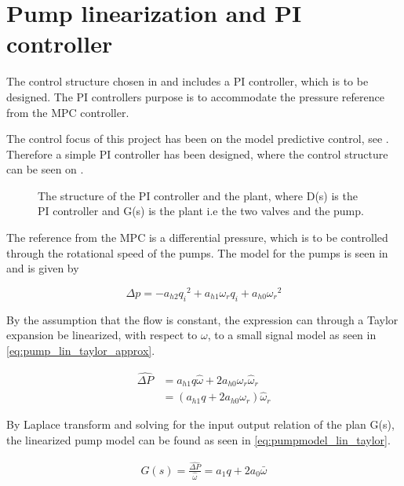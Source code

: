 \chapter{Pump linearization and PI controller}
\label{cha:linear_pump2}

The control structure chosen in  and  includes a PI controller, which is to be designed. The PI controllers purpose is to accommodate the pressure reference from the MPC controller. 

The control focus of this project has been on the model predictive control, see . Therefore a simple PI controller has been designed, where the control structure can be seen on .

\begin{figure}[H]
\centering
  
\caption{The structure of the PI controller and the plant, where D(s) is the PI controller and G(s) is the plant i.e the two valves and the pump.}
\label{fig:simple_PI}
\end{figure}

The reference from the MPC is a differential pressure, which is to be controlled through the rotational speed of the pumps. The model for the pumps is seen in  and is given by

\begin{equation*}
\Delta p = -a_{h2}{q_i}^2 + a_{h1} \omega_r q_i + a_{h0}{\omega_r}^2
\end{equation*}

By the assumption that the flow is constant, the expression can through a Taylor expansion be linearized, with respect to $\omega$, to a small signal model as seen in \eqref{eq:pump_lin_taylor_approx}.


\begin{equation}
	\begin{split}
		\hat{\Delta P} &= a_{h1}q\hat{\omega} + 2a_{h0}{\omega_r}\hat{\omega}_r\\
					   &= (a_{h1}q + 2a_{h0}{\omega_r}) \hat{\omega}_r
	\end{split}
	\label{eq:pump_lin_taylor_approx}
\end{equation}

By Laplace transform and solving for the input output relation of the plan G(s), the linearized pump model can be found as seen in \eqref{eq:pumpmodel_lin_taylor}.

\begin{equation}
	\begin{split}
		G(s) = \frac{\hat{\Delta P}}{\hat{\omega}} = a_1q + 2a_0\bar{\omega}
	\end{split}
	\label{eq:pumpmodel_lin_taylor}
\end{equation}

